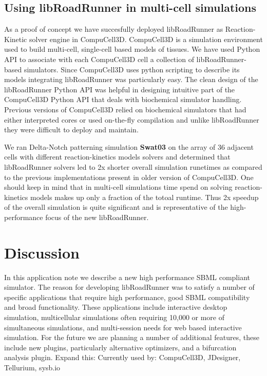 \documentclass{bioinfo}
\begin{document}
\begin{methods}
\subsection{Using libRoadRunner in multi-cell simulations}

As a proof of concept we have succesfully deployed libRoadRunner as Reaction-Kinetic solver engine in CompuCell3D. CompuCell3D is a simulation environment used to build multi-cell, single-cell based models of tissues. We have used Python API to associate with each CompuCell3D cell a collection of libRoadRunner-based simulators. Since CompuCell3D uses python scripting to describe its models integrating libRoadRunner was particularly easy. The clean design of the libRoadRunner Python API was helpful in designing intuitive part of the CompuCell3D Python API that deals with biochemical simulator handling. Previous versions of CompuCell3D relied on biochemical simulators that had either interpreted cores or used on-the-fly compilation and unlike libRoadRunner they were difficult to deploy and maintain. 

We ran Delta-Notch patterning simulation {\bf Swat03} on the array of 36 adjacent cells with different reaction-kinetics models solvers and determined that libRoadRunner solvers led to  2x shorter overall simulation runetimes as compared to the previous implementations present in older version of CompuCell3D. One should keep in mind that in multi-cell simulations time spend on solving reaction-kinetics models makes up only a fraction of the totoal runtime. Thus 2x  speedup of the overall simulation is quite significant and is representative of the high-performance focus of the new libRoadRunner. 
  

\end{methods}

\section{Discussion}

In this application note we describe a new high performance SBML compliant simulator. The reason for developing libRoadRunner was to satisfy a number of specific applications that require high performance, good SBML compatibility and broad functionality. These applications include interactive desktop simulation, multicellular simulations often requiring 10,000 or more of simultaneous simulations, and multi-session needs for web based interactive simulation.  For the future we are planning a number of additional features, these include new plugins, particularly alternative optimizers, and a bifurcation analysis plugin. Expand this: Currently used by: CompuCell3D, JDesigner, Tellurium, sysb.io
\end{document}
